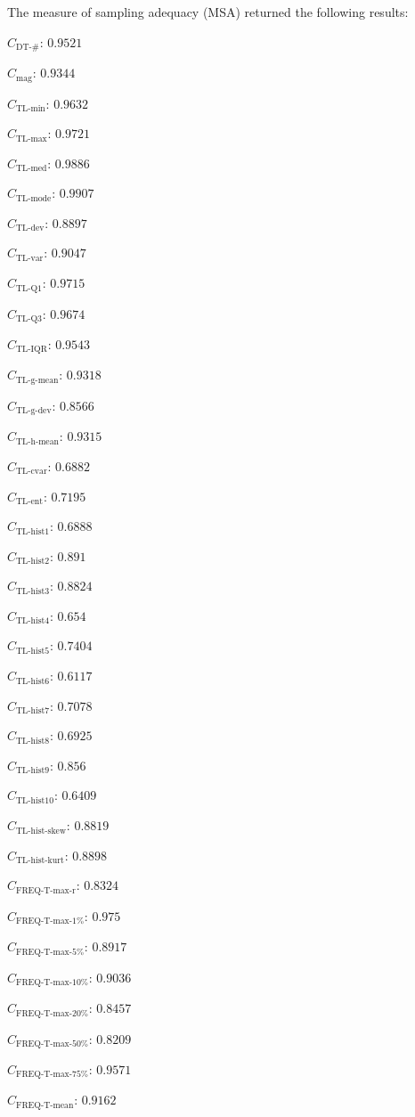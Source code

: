 \documentclass[a4paper]{article}
\newcommand{\magnitudename}{\text{mag}}
\newcommand{\magnitude}{C_{\magnitudename}}
\newcommand{\tlminname}{\text{TL-min}}
\newcommand{\tlmin}{C_{\tlminname}}
\newcommand{\tlmaxname}{\text{TL-max}}
\newcommand{\tlmax}{C_{\tlmaxname}}
\newcommand{\tlmedname}{\text{TL-med}}
\newcommand{\tlmed}{C_{\tlmedname}}
\newcommand{\tlmodename}{\text{TL-mode}}
\newcommand{\tlmode}{C_{\tlmodename}}
\newcommand{\tldevname}{\text{TL-dev}}
\newcommand{\tldev}{C_{\tldevname}}
\newcommand{\tlvarname}{\text{TL-var}}
\newcommand{\tlvar}{C_{\tlvarname}}
\newcommand{\tlqonename}{\text{TL-Q1}}
\newcommand{\tlqone}{C_{\tlqonename}}
\newcommand{\tlqthreename}{\text{TL-Q3}}
\newcommand{\tlqthree}{C_{\tlqthreename}}
\newcommand{\tliqrname}{\text{TL-IQR}}
\newcommand{\tliqr}{C_{\tliqrname}}
\newcommand{\tlgmeanname}{\text{TL-g-mean}}
\newcommand{\tlgmean}{C_{\tlgmeanname}}
\newcommand{\tlgdevname}{\text{TL-g-dev}}
\newcommand{\tlgdev}{C_{\tlgdevname}}
\newcommand{\tlhmeanname}{\text{TL-h-mean}}
\newcommand{\tlhmean}{C_{\tlhmeanname}}
\newcommand{\tlcvariationname}{\text{TL-cvar}}
\newcommand{\tlcvariation}{C_{\tlcvariationname}}
\newcommand{\tlentropyname}{\text{TL-ent}}
\newcommand{\tlentropy}{C_{\tlentropyname}}
\newcommand{\tlhistonename}{\text{TL-hist1}}
\newcommand{\tlhistone}{C_{\tlhistonename}}
\newcommand{\tlhisttwoname}{\text{TL-hist2}}
\newcommand{\tlhisttwo}{C_{\tlhisttwoname}}
\newcommand{\tlhistthreename}{\text{TL-hist3}}
\newcommand{\tlhistthree}{C_{\tlhistthreename}}
\newcommand{\tlhistfourname}{\text{TL-hist4}}
\newcommand{\tlhistfour}{C_{\tlhistfourname}}
\newcommand{\tlhistfivename}{\text{TL-hist5}}
\newcommand{\tlhistfive}{C_{\tlhistfivename}}
\newcommand{\tlhistsixname}{\text{TL-hist6}}
\newcommand{\tlhistsix}{C_{\tlhistsixname}}
\newcommand{\tlhistsevenname}{\text{TL-hist7}}
\newcommand{\tlhistseven}{C_{\tlhistsevenname}}
\newcommand{\tlhisteightname}{\text{TL-hist8}}
\newcommand{\tlhisteight}{C_{\tlhisteightname}}
\newcommand{\tlhistninename}{\text{TL-hist9}}
\newcommand{\tlhistnine}{C_{\tlhistninename}}
\newcommand{\tlhisttenname}{\text{TL-hist10}}
\newcommand{\tlhistten}{C_{\tlhisttenname}}
\newcommand{\tlskewhistname}{\text{TL-hist-skew}}
\newcommand{\tlskewhist}{C_{\tlskewhistname}}
\newcommand{\tlkurthistname}{\text{TL-hist-kurt}}
\newcommand{\tlkurthist}{C_{\tlkurthistname}}
\newcommand{\freqmaxrname}{\text{FREQ-T-max-r}}
\newcommand{\freqmaxr}{C_{\freqmaxrname}}
\newcommand{\freqmaxonename}{\text{FREQ-T-max-1\%}}
\newcommand{\freqmaxone}{C_{\freqmaxonename}}
\newcommand{\freqmaxfivename}{\text{FREQ-T-max-5\%}}
\newcommand{\freqmaxfive}{C_{\freqmaxfivename}}
\newcommand{\freqmaxtenname}{\text{FREQ-T-max-10\%}}
\newcommand{\freqmaxten}{C_{\freqmaxtenname}}
\newcommand{\freqmaxtwentyname}{\text{FREQ-T-max-20\%}}
\newcommand{\freqmaxtwenty}{C_{\freqmaxtwentyname}}
\newcommand{\freqmaxfiftyname}{\text{FREQ-T-max-50\%}}
\newcommand{\freqmaxfifty}{C_{\freqmaxfiftyname}}
\newcommand{\freqmaxseventyfivename}{\text{FREQ-T-max-75\%}}
\newcommand{\freqmaxseventyfive}{C_{\freqmaxseventyfivename}}
\newcommand{\freqmeanname}{\text{FREQ-T-mean}}
\newcommand{\freqmean}{C_{\freqmeanname}}
\newcommand{\numberuniquetracesname}{\text{DT-\#}}
\newcommand{\numberuniquetraces}{C_{\numberuniquetracesname}}
\begin{document}
\noindent
The measure of sampling adequacy (MSA) returned the following results:
\begin{compactitem}
\item $\numberuniquetraces$: $0.9521$
\item $\magnitude$: $0.9344$
\item $\tlmin$: $0.9632$
\item $\tlmax$: $0.9721$
\item $\tlmed$: $0.9886$
\item $\tlmode$: $0.9907$
\item $\tldev$: $0.8897$
\item $\tlvar$: $0.9047$
\item $\tlqone$: $0.9715$
\item $\tlqthree$: $0.9674$
\item $\tliqr$: $0.9543$
\item $\tlgmean$: $0.9318$
\item $\tlgdev$: $0.8566$
\item $\tlhmean$: $0.9315$
\item $\tlcvariation$: $0.6882$
\item $\tlentropy$: $0.7195$
\item $\tlhistone$: $0.6888$
\item $\tlhisttwo$: $0.891$
\item $\tlhistthree$: $0.8824$
\item $\tlhistfour$: $0.654$
\item $\tlhistfive$: $0.7404$
\item $\tlhistsix$: $0.6117$
\item $\tlhistseven$: $0.7078$
\item $\tlhisteight$: $0.6925$
\item $\tlhistnine$: $0.856$
\item $\tlhistten$: $0.6409$
\item $\tlskewhist$: $0.8819$
\item $\tlkurthist$: $0.8898$
\item $\freqmaxr$: $0.8324$
\item $\freqmaxone$: $0.975$
\item $\freqmaxfive$: $0.8917$
\item $\freqmaxten$: $0.9036$
\item $\freqmaxtwenty$: $0.8457$
\item $\freqmaxfifty$: $0.8209$
\item $\freqmaxseventyfive$: $0.9571$
\item $\freqmean$: $0.9162$

\end{compactitem}
\end{document}
